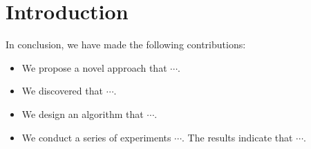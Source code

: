 \section{Introduction}\label{sec:introduction}







In conclusion,
we have made the following contributions:

\begin{itemize}

    \item We propose a novel approach that $\cdots$.

    \item We discovered that $\cdots$.

    \item We design an algorithm that $\cdots$.

    \item We conduct a series of experiments $\cdots$.
    The results indicate that $\cdots$.

\end{itemize}
